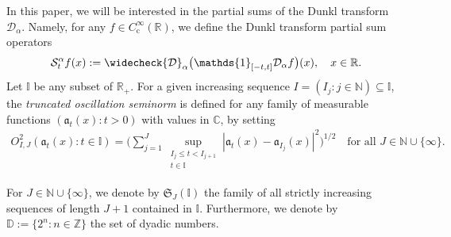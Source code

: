 \documentclass[11pt,oneside]{amsart}
\numberwithin{equation}{section}
\theoremstyle{definition}
\begin{document}
In this paper, we will be interested in the partial sums of the Dunkl transform $\mathcal{D}_\alpha$. Namely, for any $f \in C_{\mathrm{c}}^\infty(\mathbb{R})$, we define the Dunkl transform partial sum operators
\begin{equation*}
    \mathcal{S}_{t}^\alpha f(x) := \widecheck{\mathcal{D}}_{\alpha}\big(\mathds{1}_{[-t,t]} \mathcal{D}_\alpha f\big)(x), \quad x \in \mathbb{R}.
\end{equation*}
\indent Let \( \mathbb{I} \) be any subset of \( \mathbb{R}_+ \).  
For a given increasing sequence \( I = (I_j : j \in \mathbb{N}) \subseteq \mathbb{I} \),  
the \emph{truncated oscillation seminorm} is defined for any family of measurable functions  
\( (\mathfrak{a}_t(x) : t > 0) \) with values in \( \mathbb{C} \), by setting
\begin{align}
\label{eq:45}
O_{I, J}^2(\mathfrak{a}_t(x): t \in \mathbb{I}) 
= \bigg( \sum_{j=1}^J \sup_{\substack{I_j \le t < I_{j+1} \\ t \in \mathbb{I}}} 
\left| \mathfrak{a}_t(x) - \mathfrak{a}_{I_j}(x) \right|^2 \bigg)^{1/2}
\quad \text{for all } J \in \mathbb{N} \cup \{\infty\}.
\end{align}

For \( J \in \mathbb{N} \cup \{\infty\} \), we denote by \( \mathfrak{S}_J(\mathbb{I}) \) the family of all strictly increasing sequences of length \( J + 1 \) contained in \( \mathbb{I} \). Furthermore, we denote by \( \mathbb{D} := \{ 2^n : n \in \mathbb{Z} \} \) the set of dyadic numbers.
\end{document}
